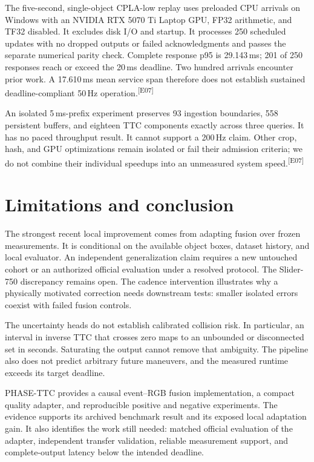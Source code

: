 \documentclass[twocolumn,letterpaper]{article}
\newcommand{\evid}[1]{\textsuperscript{\textsf{[#1]}}}
\begin{document}
The five-second, single-object CPLA-low replay uses preloaded CPU arrivals on Windows with an NVIDIA RTX 5070 Ti Laptop GPU, FP32 arithmetic, and TF32 disabled. It excludes disk I/O and startup. It processes 250 scheduled updates with no dropped outputs or failed acknowledgments and passes the separate numerical parity check. Complete response p95 is 29.143\,ms; 201 of 250 responses reach or exceed the 20\,ms deadline. Two hundred arrivals encounter prior work. A 17.610\,ms mean service span therefore does not establish sustained deadline-compliant 50\,Hz operation.\evid{E07}

An isolated 5\,ms-prefix experiment preserves 93 ingestion boundaries, 558 persistent buffers, and eighteen TTC components exactly across three queries. It has no paced throughput result. It cannot support a 200\,Hz claim. Other crop, hash, and GPU optimizations remain isolated or fail their admission criteria; we do not combine their individual speedups into an unmeasured system speed.\evid{E07}

\section{Limitations and conclusion}
The strongest recent local improvement comes from adapting fusion over frozen measurements. It is conditional on the available object boxes, dataset history, and local evaluator. An independent generalization claim requires a new untouched cohort or an authorized official evaluation under a resolved protocol. The Slider-750 discrepancy remains open. The cadence intervention illustrates why a physically motivated correction needs downstream tests: smaller isolated errors coexist with failed fusion controls.

The uncertainty heads do not establish calibrated collision risk. In particular, an interval in inverse TTC that crosses zero maps to an unbounded or disconnected set in seconds. Saturating the output cannot remove that ambiguity. The pipeline also does not predict arbitrary future maneuvers, and the measured runtime exceeds its target deadline.

PHASE-TTC provides a causal event--RGB fusion implementation, a compact quality adapter, and reproducible positive and negative experiments. The evidence supports its archived benchmark result and its exposed local adaptation gain. It also identifies the work still needed: matched official evaluation of the adapter, independent transfer validation, reliable measurement support, and complete-output latency below the intended deadline.
\end{document}
